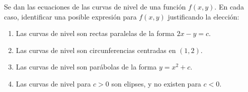 Se dan las ecuaciones de las curvas de nivel de una función $f(x,y)$. En cada caso, identificar una posible expresión para $f(x,y)$ justificando la elección:
\begin{enumerate}
    \item Las curvas de nivel son rectas paralelas de la forma $2x - y = c$.
    \item Las curvas de nivel son circunferencias centradas en $(1, 2)$.
    \item Las curvas de nivel son parábolas de la forma $y = x^2 + c$.
    \item Las curvas de nivel para $c > 0$ son elipses, y no existen para $c < 0$.
\end{enumerate}